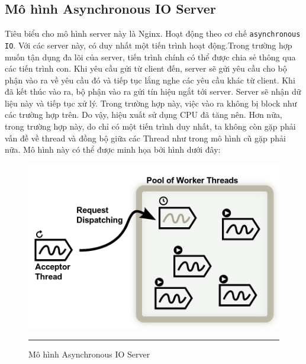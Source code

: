 	\subsection{Mô hình Asynchronous IO Server}
	Tiêu biểu cho mô hình server này là Nginx. Hoạt động theo cơ chế \texttt{asynchronous IO}. Với các server này, có duy nhất một tiến trình hoạt động.Trong trường hợp muốn tận dụng đa lõi của server, tiến trình chính có thể được chia sẻ thông qua các tiến trình con. Khi yêu cầu gửi từ client đến, server sẽ gửi yêu cầu cho bộ phận vào ra về yêu cầu đó và tiếp tục lắng nghe các yêu cầu khác từ client. Khi đã kết thúc vào ra, bộ phận vào ra gửi tín hiệu ngắt tới server. Server sẽ nhận dữ liệu này và tiếp tục xử lý. Trong trường hợp này, việc vào ra không bị block như các trường hợp trên. Do vậy, hiệu xuất sử dụng CPU đã tăng nên. Hơn nữa, trong trường hợp này, do chỉ có một tiến trình duy nhất, ta không còn gặp phải vấn đề về thread và đồng bộ giữa các Thread như trong mô hình cũ gặp phải nữa. Mô hình này có thể được minh họa bởi hình dưới đây:
	\begin{figure}
        \centering
        \includegraphics[scale=0.7]{io}
        \rule{35em}{0.5pt}
        \caption{Mô hình Asynchronous IO Server}
        \label{fig:nio}
    \end{figure}
